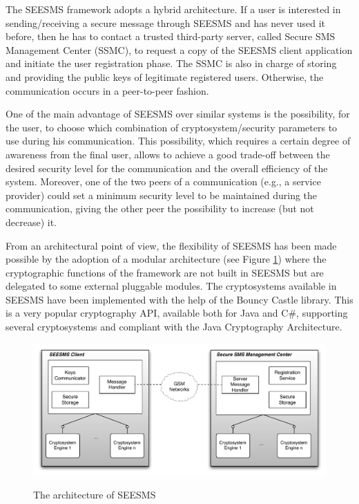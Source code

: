 \documentclass[authoryear]{elsarticle}
\begin{document}
The SEESMS framework adopts a hybrid architecture. If a user is interested in sending/receiving a secure message through SEESMS and has never used it before, then he has to contact a trusted third-party server, called Secure SMS Management Center (SSMC), to request a copy of the SEESMS client application and initiate the user registration phase. The SSMC is also in charge of storing and providing the public keys of legitimate registered users. Otherwise, the communication occurs in a peer-to-peer fashion. 

One of the main advantage of SEESMS over similar systems is the possibility, for the user, to choose which combination of cryptosystem/security parameters to use during his communication. This possibility, which requires a certain degree of awareness from the final user, allows to achieve a good trade-off between the desired security level for the communication and the overall efficiency of the system. Moreover, one of the two peers of a communication (e.g., a service provider) could set a minimum security level to be maintained during the communication, giving the other peer the possibility to increase (but not decrease) it. 


From an architectural point of view, the flexibility of SEESMS has been made possible by the adoption of a modular architecture (see Figure \ref{fig:arch}) where the cryptographic functions of the framework are not built in SEESMS but are delegated to some external pluggable modules.  The cryptosystems available in SEESMS have been implemented with the help of the Bouncy Castle library. This is a very popular cryptography API, available both for Java and C\#, supporting several cryptosystems and compliant with the Java Cryptography Architecture. 

\begin{figure}[ht]
\begin{center}
  \includegraphics[width=12cm]{immagini/archJwhisper.pdf}\\
  \caption{The architecture of SEESMS}
  \label{fig:arch}
\end{center}
\end{figure}
\end{document}
